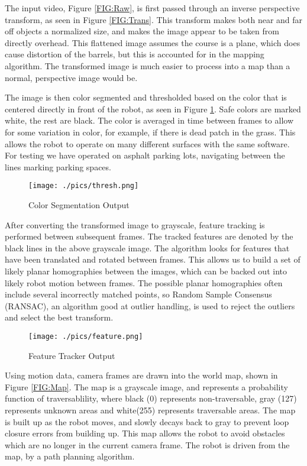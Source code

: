 The input video, Figure \ref{FIG:Raw}, is first passed through an inverse perspective transform, as seen in Figure \ref{FIG:Trans}. This transform makes both near and far off objects a normalized size, and makes the image appear to be taken from directly overhead. This flattened image assumes the course is a plane, which does cause distortion of the barrels, but this is accounted for in the mapping algorithm. The transformed image is much easier to process into a map than a normal, perspective image would be.

The image is then color segmented and thresholded based on the color that is centered directly in front of the robot, as seen in Figure \ref{FIG:ColorSeg}. Safe colors are marked white, the rest are black. The color is averaged in time between frames to allow for some variation in color, for example, if there is dead patch in the grass. This allows the robot to operate on many different surfaces with the same software. For testing we have operated on asphalt parking lots, navigating between the lines marking parking spaces.

\begin{figure}[H]
\begin{center}
\texttt{[image: ./pics/thresh.png]}
\caption{Color Segmentation Output}
\label{FIG:ColorSeg}
\end{center}
\end{figure}

After converting the transformed image to grayscale, feature tracking is performed between subsequent frames. The tracked features are denoted by the black lines in the above grayscale image. The algorithm looks for features that have been translated and rotated between frames. This allows us to build a set of likely planar homographies between the images, which can be backed out into likely robot motion between frames. The possible planar homographies often include several incorrectly matched points, so Random Sample Consensus (RANSAC), an algorithm good at outlier handling, is used to reject the outliers and select the best transform.

\begin{figure}[H]
\begin{center}
\texttt{[image: ./pics/feature.png]}
\caption{Feature Tracker Output}
\label{FIG:Feature}
\end{center}
\end{figure}

Using motion data, camera frames are drawn into the world map, shown in Figure \ref{FIG:Map}. The map is a grayscale image, and represents a probability function of traversablility, where black (0) represents non-traversable, gray (127) represents unknown areas and white(255) represents traversable areas. The map is built up as the robot moves, and slowly decays back to gray to prevent loop closure errors from building up. This map allows the robot to avoid obstacles which are no longer in the current camera frame. The robot is driven from the map, by a path planning algorithm.

